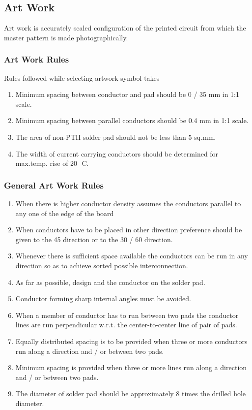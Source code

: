 \documentclass[12pt,a4paper,oneside,openright]{report}
\begin{document}
\subsection{Art Work}
Art work is accurately scaled configuration of the printed circuit from which the master pattern is made photographically. 
\subsubsection{Art Work Rules}
Rules followed while selecting artwork symbol takes 
\begin{enumerate}
 \item Minimum spacing between conductor and pad should be 0 / 35 mm in 1:1 scale. 
\item Minimum spacing between parallel conductors should be 0.4 mm in 1:1 scale. 
\item The area of non-PTH solder pad should not be less than 5 sq.mm. 
\item The width of current carrying conductors should be determined for max.temp. rise of 20 ْ C.
\end{enumerate}
\subsubsection{General Art Work Rules}
\begin{enumerate}
 \item When there is higher conductor density assumes the conductors parallel to any one of the edge of the board 
\item When conductors have to be placed in other direction preference should be given to the 45ْ direction or to the 30ْ / 60ْ direction. 
\item Whenever there is sufficient space available the conductors can be run in any direction so as to achieve sorted possible interconnection. 
\item As far as possible, design and the conductor on the solder pad. 
\item Conductor forming sharp internal angles must be avoided. 
\item When a member of conductor has to run between two pads the conductor lines are run perpendicular w.r.t. the center-to-center line of pair of pads. 
\item Equally distributed spacing is to be provided when three or more conductors run along a direction and / or between two pads. 
\item Minimum spacing is provided when three or more lines run along a direction and / or between two pads.
\item The diameter of solder pad should be approximately 8 times the drilled hole diameter.
\end{enumerate}
\end{document}
